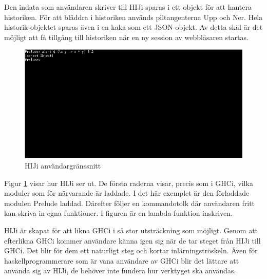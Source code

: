 Den indata som användaren skriver till HIJi sparas i ett objekt för att hantera historiken. För att bläddra i historiken används piltangenterna Upp och Ner. Hela historik-objektet sparas även i en kaka som ett JSON-objekt. Av detta skäl är det möjligt att få tillgång till historiken när en ny session av webbläsaren startas.

\begin{figure}[H]
    \begin{center}
        \includegraphics[width=1\textwidth]{hiji_screen3.png}
        \caption{HIJi användargränssnitt}
        \label{fig:hiji} %
    \end{center}
\end{figure}

Figur \ref{fig:hiji} visar hur HIJi ser ut. De första raderna visar, precis som i GHCi, vilka moduler som för närvarande är laddade. I det här exemplet är den förladdade modulen Prelude laddad. Därefter följer en kommandotolk där användaren fritt kan skriva in egna funktioner. I figuren är en lambda-funktion inskriven.

HIJi är skapat för att likna GHCi i så stor utsträckning som möjligt.
Genom att efterlikna GHCi kommer användare känna igen sig när de tar steget från HIJi till GHCi. Det blir för dem ett naturligt steg och kortar inlärningströskeln. Även för haskellprogrammerare som är vana användare av GHCi blir det lättare att använda sig av HIJi, de behöver inte fundera hur verktyget ska användas.

